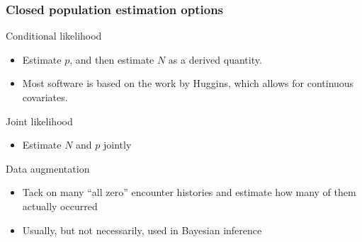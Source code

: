 \documentclass[color=usenames,dvipsnames]{beamer}\usepackage[]{graphicx}\usepackage[]{xcolor}
\begin{document}
\begin{frame}
  \frametitle{Closed population estimation options}
  Conditional likelihood \\
  \begin{itemize}
    \item Estimate $p$, and then estimate $N$ as a derived
      quantity. %
    \item Most software is based on the work by Huggins, which allows
      for continuous covariates. 
  \end{itemize}
  \pause
  \vfill
  Joint likelihood \\
  \begin{itemize}
    \item Estimate $N$ and $p$ jointly
  \end{itemize}
  \pause \vfill
  Data augmentation \\
  \begin{itemize}
    \item Tack on many ``all zero'' encounter histories and estimate
      how many of them actually occurred
    \item Usually, but not necessarily, used in Bayesian inference
  \end{itemize}
\end{frame}
\end{document}
